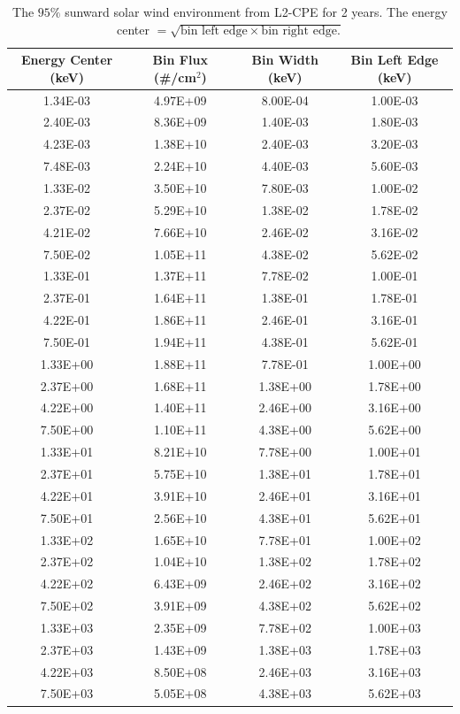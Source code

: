 \documentclass{hitec}
\begin{document}
\begin{table}[!h]\centering
	\caption{The $95\%$ sunward solar wind environment from L2-CPE for 2 years. The energy center $=\sqrt{\text{bin left edge}\times\text{bin right edge}.}$}\label{tab:p95_sunward_solarwind_IMP}
	\begin{tabular}{|c | c | c | c |}\hline
		Energy Center (keV) & Bin Flux (\#/cm$^2$) & Bin Width (keV) & Bin Left Edge (keV) \\\hline
1.34E-03&4.97E+09&8.00E-04&1.00E-03\\\hline
2.40E-03&8.36E+09&1.40E-03&1.80E-03\\\hline
4.23E-03&1.38E+10&2.40E-03&3.20E-03\\\hline
7.48E-03&2.24E+10&4.40E-03&5.60E-03\\\hline
1.33E-02&3.50E+10&7.80E-03&1.00E-02\\\hline
2.37E-02&5.29E+10&1.38E-02&1.78E-02\\\hline
4.21E-02&7.66E+10&2.46E-02&3.16E-02\\\hline
7.50E-02&1.05E+11&4.38E-02&5.62E-02\\\hline
1.33E-01&1.37E+11&7.78E-02&1.00E-01\\\hline
2.37E-01&1.64E+11&1.38E-01&1.78E-01\\\hline
4.22E-01&1.86E+11&2.46E-01&3.16E-01\\\hline
7.50E-01&1.94E+11&4.38E-01&5.62E-01\\\hline
1.33E+00&1.88E+11&7.78E-01&1.00E+00\\\hline
2.37E+00&1.68E+11&1.38E+00&1.78E+00\\\hline
4.22E+00&1.40E+11&2.46E+00&3.16E+00\\\hline
7.50E+00&1.10E+11&4.38E+00&5.62E+00\\\hline
1.33E+01&8.21E+10&7.78E+00&1.00E+01\\\hline
2.37E+01&5.75E+10&1.38E+01&1.78E+01\\\hline
4.22E+01&3.91E+10&2.46E+01&3.16E+01\\\hline
7.50E+01&2.56E+10&4.38E+01&5.62E+01\\\hline
1.33E+02&1.65E+10&7.78E+01&1.00E+02\\\hline
2.37E+02&1.04E+10&1.38E+02&1.78E+02\\\hline
4.22E+02&6.43E+09&2.46E+02&3.16E+02\\\hline
7.50E+02&3.91E+09&4.38E+02&5.62E+02\\\hline
1.33E+03&2.35E+09&7.78E+02&1.00E+03\\\hline
2.37E+03&1.43E+09&1.38E+03&1.78E+03\\\hline
4.22E+03&8.50E+08&2.46E+03&3.16E+03\\\hline
7.50E+03&5.05E+08&4.38E+03&5.62E+03\\\hline
	\end{tabular}
\end{table}
\clearpage %
\end{document}
